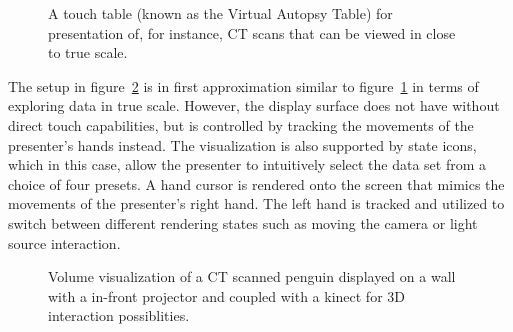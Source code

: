 \documentclass[review,journal]{vgtc}         %
\begin{document}
\begin{figure}[htb]
	\centering
	\caption{A touch table (known as the Virtual Autopsy Table) for presentation of, for instance, CT scans that can be viewed in close to true scale.}
	\label{img:exhibition_table}
\end{figure}

The setup in figure~\ref{img:exhibition_kinect} is in first approximation similar to figure~\ref{img:exhibition_table} in terms of exploring data in true scale.
However, the display surface does not have without direct touch capabilities, but is controlled by tracking the movements of the presenter's hands instead.
The visualization is also supported by state icons, which in this case, allow the presenter to intuitively select the data set from a choice of four presets.
A hand cursor is rendered onto the screen that mimics the movements of the presenter's right hand.
The left hand is tracked and utilized to switch between different rendering states such as moving the camera or light source interaction.

\begin{figure}[htb]
	\centering
	\caption{Volume visualization of a CT scanned penguin displayed on a wall with a in-front projector and coupled with a kinect for 3D interaction possiblities.}
	\label{img:exhibition_kinect}
\end{figure}
\end{document}
